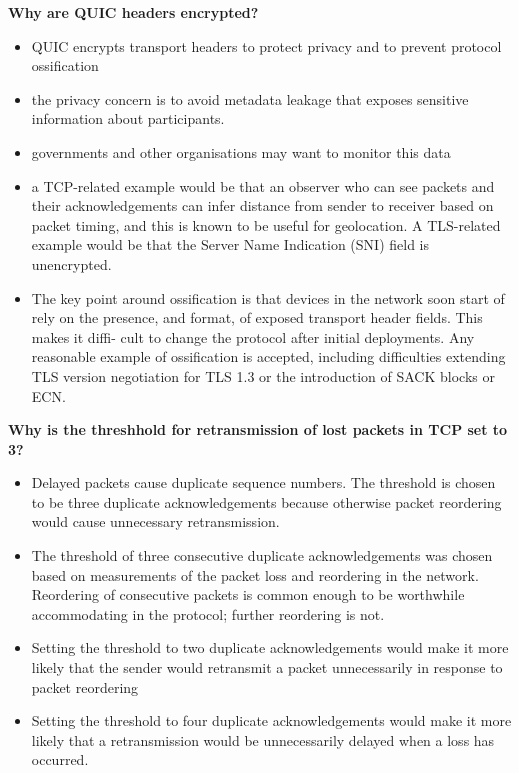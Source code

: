 \documentclass{article}
\begin{document}
\textbf{Why are QUIC headers encrypted?}
\begin{itemize}
    \item QUIC encrypts transport headers to protect privacy and to prevent protocol ossification
    \item the privacy concern is to avoid metadata leakage that exposes sensitive information about participants.
    \item governments and other organisations may want to monitor this data
    \item a TCP-related example would be that an observer who can see packets and their
    acknowledgements can infer distance from sender to receiver based on packet timing,
    and this is known to be useful for geolocation. A TLS-related example would be that
    the Server Name Indication (SNI) field is unencrypted.
    \item  The key point around ossification is that devices in the network soon start of rely on the
    presence, and format, of exposed transport header fields. This makes it diffi-
    cult to change the protocol after initial deployments. Any reasonable example
    of ossification is accepted, including difficulties extending TLS version negotiation for
    TLS 1.3 or the introduction of SACK blocks or ECN\@.
\end{itemize}

\textbf{Why is the threshhold for retransmission of lost packets in TCP set to 3?}
\begin{itemize}
    \item Delayed packets cause duplicate sequence numbers. The threshold
    is chosen to be three duplicate acknowledgements because otherwise packet reordering
    would cause unnecessary retransmission.
    \item The threshold of three consecutive duplicate acknowledgements was chosen based on
    measurements of the packet loss and reordering in the network. Reordering
    of consecutive packets is common enough to be worthwhile accommodating in the
    protocol; further reordering is not.
    \item Setting the threshold to two duplicate acknowledgements would make it more likely
    that the sender would retransmit a packet unnecessarily in response to packet reordering
    \item Setting the threshold to four duplicate acknowledgements would make it more likely that
    a retransmission would be unnecessarily delayed when a loss has occurred.
\end{itemize}
\end{document}
